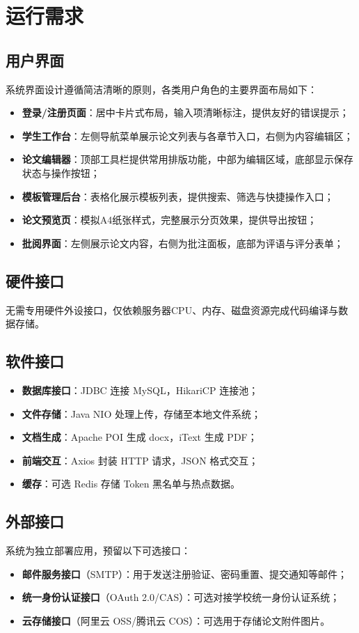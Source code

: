 \documentclass{softeng}
\begin{document}
\section{运行需求}
\subsection{用户界面}
系统界面设计遵循简洁清晰的原则，各类用户角色的主要界面布局如下：
\begin{itemize}
\item \textbf{登录/注册页面}：居中卡片式布局，输入项清晰标注，提供友好的错误提示；
\item \textbf{学生工作台}：左侧导航菜单展示论文列表与各章节入口，右侧为内容编辑区；
\item \textbf{论文编辑器}：顶部工具栏提供常用排版功能，中部为编辑区域，底部显示保存状态与操作按钮；
\item \textbf{模板管理后台}：表格化展示模板列表，提供搜索、筛选与快捷操作入口；
\item \textbf{论文预览页}：模拟A4纸张样式，完整展示分页效果，提供导出按钮；
\item \textbf{批阅界面}：左侧展示论文内容，右侧为批注面板，底部为评语与评分表单；
\end{itemize}

\subsection{硬件接口}
无需专用硬件外设接口，仅依赖服务器CPU、内存、磁盘资源完成代码编译与数据存储。

\subsection{软件接口}
	\begin{itemize}
		\item \textbf{数据库接口}：JDBC 连接 MySQL，HikariCP 连接池；
		\item \textbf{文件存储}：Java NIO 处理上传，存储至本地文件系统；
		\item \textbf{文档生成}：Apache POI 生成 docx，iText 生成 PDF；
		\item \textbf{前端交互}：Axios 封装 HTTP 请求，JSON 格式交互；
		\item \textbf{缓存}：可选 Redis 存储 Token 黑名单与热点数据。
	\end{itemize}
	
\subsection{外部接口}
	系统为独立部署应用，预留以下可选接口：
	\begin{itemize}
		\item \textbf{邮件服务接口}（SMTP）：用于发送注册验证、密码重置、提交通知等邮件；
		\item \textbf{统一身份认证接口}（OAuth 2.0/CAS）：可选对接学校统一身份认证系统；
		\item \textbf{云存储接口}（阿里云 OSS/腾讯云 COS）：可选用于存储论文附件图片。
	\end{itemize}
\end{document}
